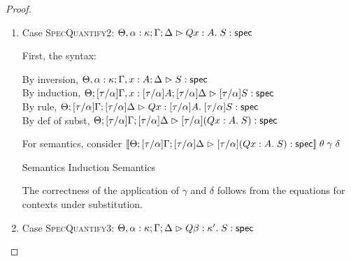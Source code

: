 \begin{proof}
\begin{enumerate}
\item Case \textsc{SpecQuantify2}: $\judgeS[\Theta, \alpha:\kappa; \Gamma; \Delta]{Q x:A.\;S}$
  
  First, the syntax:
  \begin{tabbedproof}
    \oo By inversion, $\judgeS[\Theta, \alpha:\kappa; \Gamma, x:A; \Delta]{S}$ \\
    \oo By induction, $\judgeS[\Theta; {[\tau/\alpha]}\Gamma, x:{[\tau/\alpha]}A; {[\tau/\alpha]}\Delta]{{[\tau/\alpha]}S}$ \\
    \oo By rule, $\judgeS[\Theta; {[\tau/\alpha]}\Gamma; {[\tau/\alpha]}\Delta]
                         {Q x:{[\tau/\alpha]}A.\;{[\tau/\alpha]}S}$ \\
    \oo By def of subst, $\judgeS[\Theta; {[\tau/\alpha]}\Gamma; {[\tau/\alpha]}\Delta]
                                 {{[\tau/\alpha]}(Q x:A.\;S)}$ 
  \end{tabbedproof}

  For semantics, consider
  $\interp{\judgeS[\Theta; {[\tau/\alpha]}\Gamma; {[\tau/\alpha]}\Delta]
                  {{[\tau/\alpha]}(Q x:A.\;S)}}\;\theta\;\gamma\;\delta$ 
  \begin{eqnproof}
          {Semantics}
          {Induction}
          {Semantics}
  \end{eqnproof}

  The correctness of the application of $\gamma$ and $\delta$ follows from the equations for
  contexts under substitution.

\item Case \textsc{SpecQuantify3}: $\judgeS[\Theta, \alpha:\kappa; \Gamma; \Delta]{Q \beta:\kappa'.\;S}$
  

\end{enumerate}
\end{proof}
